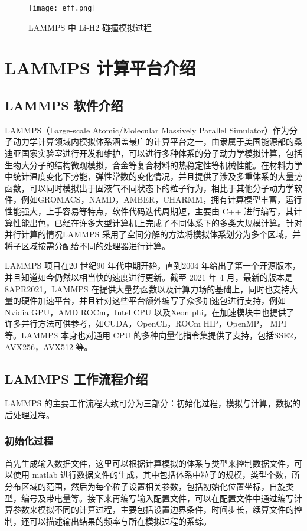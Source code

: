  \begin{figure}[h]
  \centering
  \texttt{[image: eff.png]}
  \caption{LAMMPS 中 Li-H2 碰撞模拟过程}
\end{figure}

\section{LAMMPS 计算平台介绍}
\subsection{LAMMPS 软件介绍}
LAMMPS（Large-scale Atomic/Molecular Massively Parallel Simulator）作为分子动力学计算领域内模拟体系涵盖最广的计算平台之一，由隶属于美国能源部的桑迪亚国家实验室进行开发和维护，可以进行多种体系的分子动力学模拟计算，包括生物大分子的结构微观模拟，合金等复合材料的热稳定性等机械性能。在材料力学中统计温度变化下势能，弹性常数的变化情况，并且提供了涉及多重体系的大量势函数，可以同时模拟出于固液气不同状态下的粒子行为，相比于其他分子动力学软件，例如GROMACS\cite{berendsen1995gromacs}，NAMD\cite{phillips2005scalable}，AMBER\cite{pearlman1995amber}，CHARMM\cite{brooks1983charmm}，拥有计算模型丰富，运行性能强大，上手容易等特点，软件代码迭代周期短，主要由 C++ 进行编写，其计算性能出色，已经在许多大型计算机上完成了不同体系下的多类大规模计算。针对并行计算的情况LAMMPS 采用了空间分解的方法将模拟体系划分为多个区域，并将子区域按需分配给不同的处理器进行计算。

LAMMPS 项目在20 世纪90 年代中期开始，直到2004 年给出了第一个开源版本，并且知道如今仍然以相当快的速度进行更新。截至 2021 年 4 月，最新的版本是8APR2021。LAMMPS 在提供大量势函数以及计算力场的基础上，同时也支持大量的硬件加速平台，并且针对这些平台额外编写了众多加速包进行支持，例如Nvidia GPU\cite{hong2009analytical}，AMD ROCm\cite{kuznetsov2019porting}，Intel CPU 以及Xeon phi\cite{chrysos2014intel}。在加速模块中也提供了许多并行方法可供参考，如CUDA，OpenCL，ROCm HIP，OpenMP， MPI 等。LAMMPS 本身也对通用 CPU 的多种向量化指令集提供了支持，包括SSE2\cite{bik2002automatic}，AVX256\cite{lim2018implementation}，AVX512\cite{cornea2015intel} 等。

\subsection{LAMMPS 工作流程介绍}
LAMMPS 的主要工作流程大致可分为三部分：初始化过程，模拟与计算，数据的后处理过程。

\subsubsection{初始化过程}
首先生成输入数据文件，这里可以根据计算模拟的体系与类型来控制数据文件，可以使用 matlab 进行数据文件的生成，其中包括体系中粒子的规模，类型个数，所分布区域的范围，然后为每个粒子设置相关参数，包括初始化位置坐标，自旋类型，编号及带电量等。接下来再编写输入配置文件，可以在配置文件中通过编写计算参数来模拟不同的计算过程，主要包括设置边界条件，时间步长，续算文件的控制，还可以描述输出结果的频率与所在模拟过程的系综。

